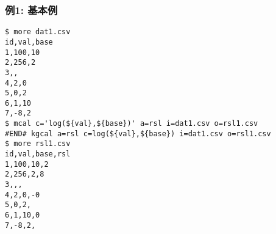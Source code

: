 \subsubsection*{例1: 基本例}



\begin{Verbatim}[baselinestretch=0.7,frame=single]
$ more dat1.csv
id,val,base
1,100,10
2,256,2
3,,
4,2,0
5,0,2
6,1,10
7,-8,2
$ mcal c='log(${val},${base})' a=rsl i=dat1.csv o=rsl1.csv
#END# kgcal a=rsl c=log(${val},${base}) i=dat1.csv o=rsl1.csv
$ more rsl1.csv
id,val,base,rsl
1,100,10,2
2,256,2,8
3,,,
4,2,0,-0
5,0,2,
6,1,10,0
7,-8,2,
\end{Verbatim}
